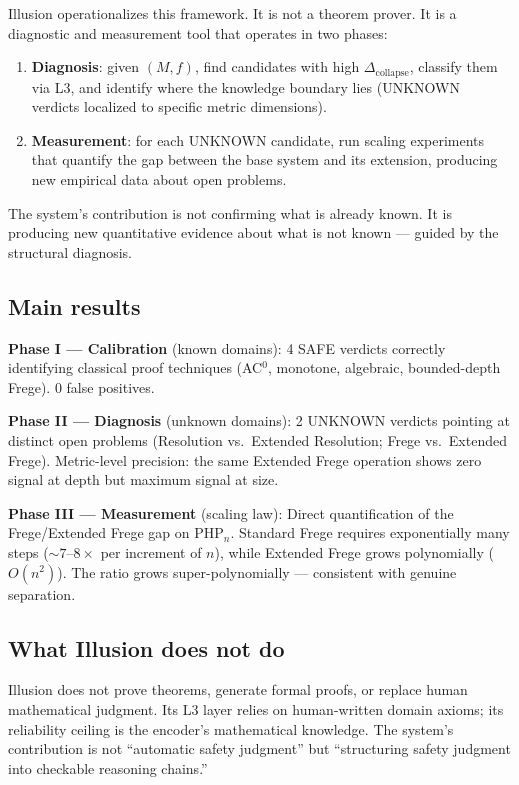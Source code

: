 \documentclass[11pt,a4paper]{article}
\newcommand{\Dcollapse}{\Delta_{\mathrm{collapse}}}
\newcommand{\PHP}{\mathrm{PHP}}
\begin{document}
Illusion operationalizes this framework. It is not a theorem prover. It is a diagnostic and measurement tool that operates in two phases:
\begin{enumerate}[nosep]
    \item \textbf{Diagnosis}: given $(M, f)$, find candidates with high $\Dcollapse$, classify them via L3, and identify where the knowledge boundary lies (UNKNOWN verdicts localized to specific metric dimensions).
    \item \textbf{Measurement}: for each UNKNOWN candidate, run scaling experiments that quantify the gap between the base system and its extension, producing new empirical data about open problems.
\end{enumerate}

The system's contribution is not confirming what is already known. It is producing new quantitative evidence about what is not known --- guided by the structural diagnosis.

\subsection{Main results}

\textbf{Phase I --- Calibration} (known domains): 4 SAFE verdicts correctly identifying classical proof techniques (AC$^0$, monotone, algebraic, bounded-depth Frege). 0 false positives.

\textbf{Phase II --- Diagnosis} (unknown domains): 2 UNKNOWN verdicts pointing at distinct open problems (Resolution vs.\ Extended Resolution; Frege vs.\ Extended Frege). Metric-level precision: the same Extended Frege operation shows zero signal at depth but maximum signal at size.

\textbf{Phase III --- Measurement} (scaling law): Direct quantification of the Frege/Extended Frege gap on $\PHP_n$. Standard Frege requires exponentially many steps ($\sim 7$--$8\times$ per increment of $n$), while Extended Frege grows polynomially ($O(n^2)$). The ratio grows super-polynomially --- consistent with genuine separation.

\subsection{What Illusion does not do}

Illusion does not prove theorems, generate formal proofs, or replace human mathematical judgment. Its L3 layer relies on human-written domain axioms; its reliability ceiling is the encoder's mathematical knowledge. The system's contribution is not ``automatic safety judgment'' but ``structuring safety judgment into checkable reasoning chains.''
\end{document}
